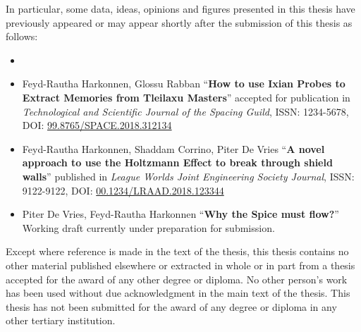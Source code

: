 In particular, some data, ideas, opinions and figures presented in this thesis have previously appeared or may appear shortly after the submission of this thesis as follows:
\begin{itemize}

  \item {}
  
  \item Feyd-Rautha Harkonnen, Glossu Rabban ``\textbf{How to use Ixian Probes to Extract Memories from Tleilaxu Masters}'' accepted for publication in \emph{Technological and Scientific Journal of the Spacing Guild}, ISSN: 1234-5678, DOI: \href{https://en.wikipedia.org/wiki/Spacing_Guild}{99.8765/SPACE.2018.312134}
  
  \item Feyd-Rautha Harkonnen, Shaddam Corrino, Piter De Vries ``\textbf{A novel approach to use the Holtzmann Effect to break through shield walls}'' published in \emph{League Worlds Joint Engineering Society Journal}, ISSN: 9122-9122, DOI: \href{https://en.wikipedia.org/wiki/Organizations_of_the_Dune_universe#Landsraad}{00.1234/LRAAD.2018.123344}
  
  \item Piter De Vries, Feyd-Rautha Harkonnen ``\textbf{Why the Spice must flow?}'' \textendash{} Working draft currently under preparation for submission. 
  
\end{itemize}
Except where reference is made in the text of the thesis, this thesis contains no other material published elsewhere or extracted in whole or in part from a thesis accepted for the award of any other degree or diploma. No other person's work has been used without due acknowledgment in the main text of the thesis. This thesis has not been submitted for the award of any degree or diploma in any other tertiary institution.

